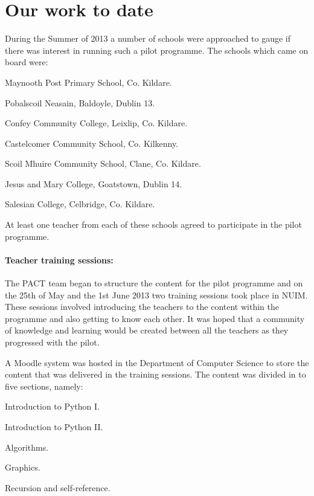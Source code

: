 \documentclass[a4paper]{article}
\begin{document}
\section{Our work to date}
During the Summer of 2013 a number of schools were approached to gauge if there was interest in running such a pilot programme. The schools which came on board were:
\begin{compactitem}
  \item Maynooth Post Primary School, Co. Kildare.
  \item Pobalscoil Neasain, Baldoyle, Dublin 13.
  \item Confey Community College, Leixlip, Co. Kildare.
  \item Castelcomer Community School, Co. Kilkenny.
  \item Scoil Mhuire Community School, Clane, Co. Kildare.
  \item Jesus and Mary College, Goatstown, Dublin 14.
  \item Salesian College, Celbridge, Co. Kildare.
\end{compactitem}

At least one teacher from each of these schools agreed to participate in the pilot programme. 

\paragraph{Teacher training sessions:}
The PACT team began to structure the content for the pilot programme and on the 25th of May and the 1st June 2013 two training sessions took place in NUIM. These sessions involved introducing the teachers to the content within the programme and also getting to know each other. It was hoped that a community of knowledge and learning would be created between all the teachers as they progressed with the pilot.

A Moodle system was hosted in the Department of Computer Science to store the content that was delivered in the training sessions. The content was divided in to five sections, namely:

\begin{compactenum}
  \item Introduction to Python I.
  \item Introduction to Python II.
  \item Algorithms.
  \item Graphics.
  \item Recursion and self-reference.
\end{compactenum}
\end{document}
